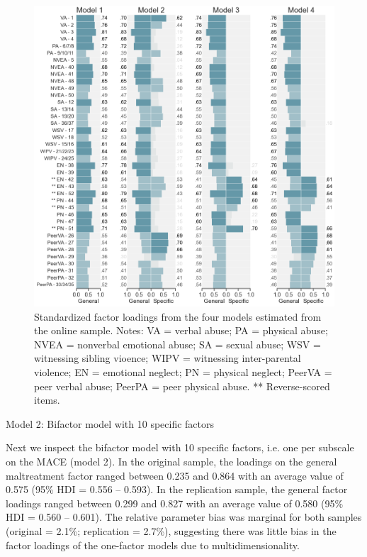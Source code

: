 \documentclass[letterpaper,man,natbib,floatsintext,longtable]{apa6}
\makeatletter
\renewcommand{\subsubsection}{\@startsection{subsubsection}{3}
  {\z@}%
  {\b@level@two@skip}{\e@level@two@skip}%
  {\normalfont\normalsize\bfseries}}
\makeatother
\begin{document}
\begin{figure}[h!]
    \centering
    \includegraphics[width=1.1\textwidth,center]{figures/fig03.png}
    \captionsetup{width=1.1\textwidth}
    \caption{Standardized factor loadings from the four models estimated from the online sample. Notes: VA = verbal abuse; PA = physical abuse; NVEA = nonverbal emotional abuse; SA = sexual abuse; WSV = witnessing sibling vioence; WIPV = witnessing inter-parental violence; EN = emotional neglect; PN = physical neglect; PeerVA = peer verbal abuse; PeerPA = peer physical abuse. ** Reverse-scored items.}
    \label{fig:loadings_online}
\end{figure}

\subsubsection{Model 2: Bifactor model with 10 specific factors}

Next we inspect the bifactor model with 10 specific factors, i.e. one per subscale on the MACE (model 2). In the original sample, the loadings on the general maltreatment factor ranged between 0.235 and 0.864 with an average value of 0.575 (95\% HDI = 0.556 -- 0.593). In the replication sample, the general factor loadings ranged between 0.299 and 0.827 with an average value of 0.580 (95\% HDI = 0.560 -- 0.601). The relative parameter bias was marginal for both samples (original = 2.1\%; replication = 2.7\%), suggesting there was little bias in the factor loadings of the one-factor models due to multidimensionality.  
\end{document}
